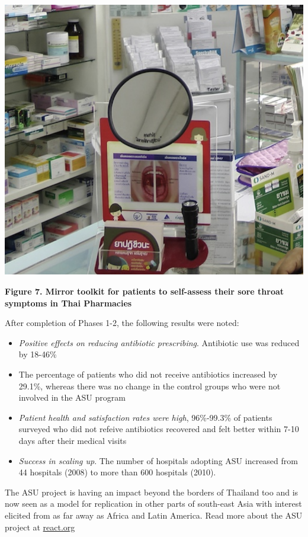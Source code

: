 \documentclass[
]{book}
\providecommand{\tightlist}{%
  \setlength{\itemsep}{0pt}\setlength{\parskip}{0pt}}
\begin{document}
\includegraphics[width=6.25in,height=\textheight]{images/mirror.png}

\textbf{Figure 7. Mirror toolkit for patients to self-assess their sore throat symptoms in Thai Pharmacies}

After completion of Phases 1-2, the following results were noted:

\begin{itemize}
\tightlist
\item
  \emph{Positive effects on reducing antibiotic prescribing}. Antibiotic use was reduced by 18-46\%
\item
  The percentage of patients who did not receive antibiotics increased by 29.1\%, whereas there was no change in the control groups who were not involved in the ASU program
\item
  \emph{Patient health and satisfaction} \emph{rates were high}, 96\%-99.3\% of patients surveyed who did not refeive antibiotics recovered and felt better within 7-10 days after their medical visits
\item
  \emph{Success in scaling up}. The number of hospitals adopting ASU increased from 44 hospitals (2008) to more than 600 hospitals (2010).
\end{itemize}

The ASU project is having an impact beyond the borders of Thailand too and is now seen as a model for replication in other parts of south-east Asia with interest elicited from as far away as Africa and Latin America. Read more about the ASU project at \href{https://www.reactgroup.org/toolbox/rational-use/examples-from-the-field/antibiotics-smart-use-thailand/}{react.org}
\end{document}
